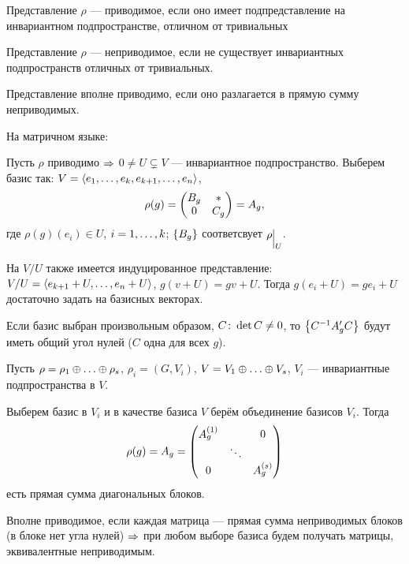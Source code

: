 \begin{df}
	Представление $\rho$ --- приводимое, если оно имеет
	подпредставление на инвариантном подпространстве,
	отличном от тривиальных
\end{df}
\begin{df}
	Представление $\rho$ --- неприводимое, если не существует
	инвариантных подпространств отличных от тривиальных.
\end{df}
\begin{df}
	Представление вполне приводимо, если оно разлагается в прямую сумму неприводимых.
\end{df}

На матричном языке:

Пусть $\rho$ приводимо $\Rightarrow$
$0 \ne U \subsetneq V$ --- инвариантное подпространство.
Выберем базис так: $V = \left\langle e_1 ,\ldots, e_k, e_{k + 1} ,\ldots, e_n\right\rangle$,
$$
	\rho(g) = \begin{pmatrix}B_g & * \\ 0 & C_g\end{pmatrix} = A_g,
$$
где $\rho(g)(e_i) \in U$, $i = 1 ,\ldots, k$;
$\left\{B_g\right\}$ соответсвует $\rho\evn{U}$.

На $V/U$ также имеется индуцированное представление:
$V/U = \left\langle e_{k+1} + U ,\ldots, e_n + U\right\rangle$, $g(v + U) = gv + U$.
Тогда $g(e_i + U) = g e_i + U$ достаточно задать на базисных векторах.

Если базис выбран произвольным образом, $C \colon \det C \ne 0$,
то $\left\{C^{-1} A'_g C\right\}$ будут иметь общий угол нулей ($C$ одна для всех $g$).

Пусть $\rho = \rho_1 \sop \rho_s$, $\rho_i = (G, V_i)$, $V = V_1 \sop V_s$,
$V_i$ --- инвариантные подпространства в $V$.

Выберем базис в $V_i$ и в качестве базиса $V$ берём объединение базисов $V_i$.
Тогда
$$
	\rho(g) = A_g = \begin{pmatrix}A^{(1)}_g && 0 \\ & \ddots & \\ 0 && A^{(s)}_g\end{pmatrix}
$$
есть прямая сумма диагональных блоков.

Вполне приводимое, если каждая матрица ---
прямая сумма неприводимых блоков (в блоке нет угла нулей) $\Rightarrow$
при любом выборе базиса будем получать матрицы, эквивалентные неприводимым.

